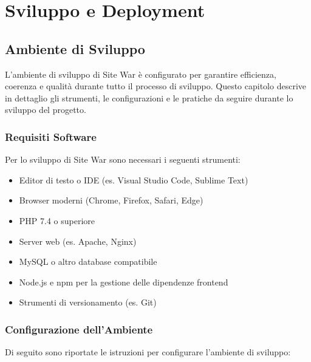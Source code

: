 \chapter{Sviluppo e Deployment}

\section{Ambiente di Sviluppo}
L'ambiente di sviluppo di Site War è configurato per garantire efficienza, coerenza e qualità durante tutto il processo di sviluppo. Questo capitolo descrive in dettaglio gli strumenti, le configurazioni e le pratiche da seguire durante lo sviluppo del progetto.

\subsection{Requisiti Software}
Per lo sviluppo di Site War sono necessari i seguenti strumenti:

\begin{itemize}
    \item Editor di testo o IDE (es. Visual Studio Code, Sublime Text)
    \item Browser moderni (Chrome, Firefox, Safari, Edge)
    \item PHP 7.4 o superiore
    \item Server web (es. Apache, Nginx)
    \item MySQL o altro database compatibile
    \item Node.js e npm per la gestione delle dipendenze frontend
    \item Strumenti di versionamento (es. Git)
\end{itemize}

\subsection{Configurazione dell'Ambiente}
Di seguito sono riportate le istruzioni per configurare l'ambiente di sviluppo:

